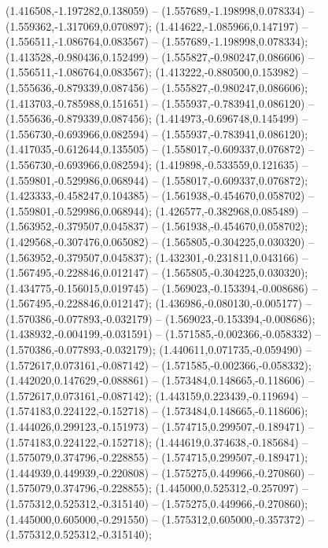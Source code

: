  (1.416508,-1.197282,0.138059) -- (1.557689,-1.198998,0.078334) -- (1.559362,-1.317069,0.070897);
 (1.414622,-1.085966,0.147197) -- (1.556511,-1.086764,0.083567) -- (1.557689,-1.198998,0.078334);
 (1.413528,-0.980436,0.152499) -- (1.555827,-0.980247,0.086606) -- (1.556511,-1.086764,0.083567);
 (1.413222,-0.880500,0.153982) -- (1.555636,-0.879339,0.087456) -- (1.555827,-0.980247,0.086606);
 (1.413703,-0.785988,0.151651) -- (1.555937,-0.783941,0.086120) -- (1.555636,-0.879339,0.087456);
 (1.414973,-0.696748,0.145499) -- (1.556730,-0.693966,0.082594) -- (1.555937,-0.783941,0.086120);
 (1.417035,-0.612644,0.135505) -- (1.558017,-0.609337,0.076872) -- (1.556730,-0.693966,0.082594);
 (1.419898,-0.533559,0.121635) -- (1.559801,-0.529986,0.068944) -- (1.558017,-0.609337,0.076872);
 (1.423333,-0.458247,0.104385) -- (1.561938,-0.454670,0.058702) -- (1.559801,-0.529986,0.068944);
 (1.426577,-0.382968,0.085489) -- (1.563952,-0.379507,0.045837) -- (1.561938,-0.454670,0.058702);
 (1.429568,-0.307476,0.065082) -- (1.565805,-0.304225,0.030320) -- (1.563952,-0.379507,0.045837);
 (1.432301,-0.231811,0.043166) -- (1.567495,-0.228846,0.012147) -- (1.565805,-0.304225,0.030320);
 (1.434775,-0.156015,0.019745) -- (1.569023,-0.153394,-0.008686) -- (1.567495,-0.228846,0.012147);
 (1.436986,-0.080130,-0.005177) -- (1.570386,-0.077893,-0.032179) -- (1.569023,-0.153394,-0.008686);
 (1.438932,-0.004199,-0.031591) -- (1.571585,-0.002366,-0.058332) -- (1.570386,-0.077893,-0.032179);
 (1.440611,0.071735,-0.059490) -- (1.572617,0.073161,-0.087142) -- (1.571585,-0.002366,-0.058332);
 (1.442020,0.147629,-0.088861) -- (1.573484,0.148665,-0.118606) -- (1.572617,0.073161,-0.087142);
 (1.443159,0.223439,-0.119694) -- (1.574183,0.224122,-0.152718) -- (1.573484,0.148665,-0.118606);
 (1.444026,0.299123,-0.151973) -- (1.574715,0.299507,-0.189471) -- (1.574183,0.224122,-0.152718);
 (1.444619,0.374638,-0.185684) -- (1.575079,0.374796,-0.228855) -- (1.574715,0.299507,-0.189471);
 (1.444939,0.449939,-0.220808) -- (1.575275,0.449966,-0.270860) -- (1.575079,0.374796,-0.228855);
 (1.445000,0.525312,-0.257097) -- (1.575312,0.525312,-0.315140) -- (1.575275,0.449966,-0.270860);
 (1.445000,0.605000,-0.291550) -- (1.575312,0.605000,-0.357372) -- (1.575312,0.525312,-0.315140);
